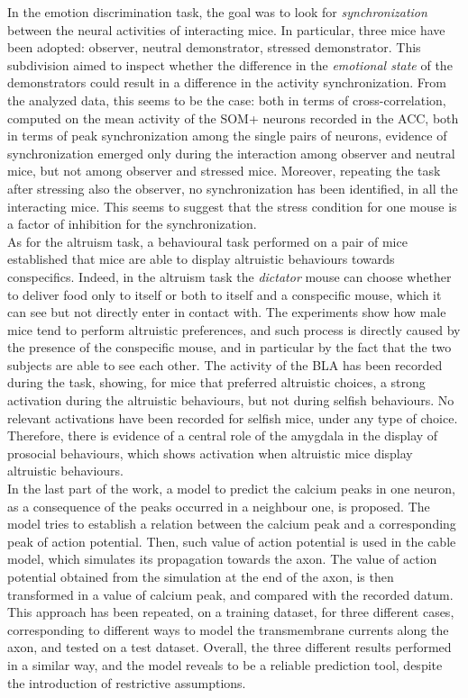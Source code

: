 \documentclass[12pt, a4paper]{report}
\begin{document}
In the  emotion discrimination task, the goal was to look for \textit{synchronization} between the neural activities of interacting mice. In particular, three mice have been adopted: observer, neutral demonstrator, stressed demonstrator. This subdivision aimed to inspect whether the difference in the \textit{emotional state} of the demonstrators could result in a difference in the activity synchronization. From the analyzed data, this seems to be the case: both in terms of cross-correlation, computed on the mean activity of the SOM+ neurons recorded in the ACC, both in terms of peak synchronization among the single pairs of neurons, evidence of synchronization emerged only during the interaction among  observer and  neutral mice, but not among  observer and  stressed mice. Moreover, repeating the task after stressing also the observer, no synchronization has been identified, in all the interacting mice.
This seems to suggest that the stress condition for one mouse is a factor of inhibition for the synchronization. \\

As for the altruism task, a behavioural task performed on a pair of mice established that mice are able to display altruistic behaviours towards conspecifics. Indeed, in the altruism task the \textit{dictator} mouse can choose whether to deliver food only to itself or both to itself and a conspecific mouse, which it can see but not directly enter in contact with. The experiments show how male mice tend to perform altruistic preferences, and such process is directly caused by the presence of the conspecific mouse, and in particular  by the fact that the two subjects are able to see each other. The activity of the BLA has been recorded during the task, showing, for mice that preferred altruistic choices, a strong activation during the altruistic behaviours, but not during selfish behaviours. No relevant activations have been recorded for selfish mice, under any type of choice. Therefore, there is evidence of a central role of the amygdala in the display of prosocial behaviours, which shows activation when altruistic mice display altruistic behaviours.\\

In the last part of the work, a model to predict the calcium peaks in one neuron, as a consequence of the peaks occurred in a neighbour one, is proposed. The model tries to establish a relation between the calcium peak and a corresponding peak of action potential. Then, such value of action potential is used in the cable model, which simulates its propagation towards the axon. The value of action potential obtained from the simulation at the end of the axon, is then transformed in a value of calcium peak, and compared with the recorded datum. This approach has been repeated, on a training dataset, for three different cases, corresponding to different ways to model the transmembrane currents along the axon, and tested on a test dataset. Overall, the three different results performed in a similar way, and the model reveals to be a reliable prediction tool, despite the introduction of restrictive assumptions.\\
\end{document}

